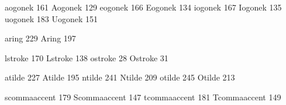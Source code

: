  aogonek          161
 Aogonek          129
 eogonek          166
 Eogonek          134
 iogonek          167
 Iogonek          135
 uogonek          183
 Uogonek          151

 aring            229
 Aring            197

 lstroke          170
 Lstroke          138
 ostroke           28
 Ostroke           31

 atilde           227
 Atilde           195
 ntilde           241
 Ntilde           209
 otilde           245
 Otilde           213

 scommaaccent     179
 Scommaaccent     147
 tcommaaccent     181
 Tcommaaccent     149

\stopencoding

\endinput
